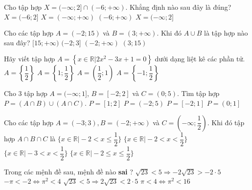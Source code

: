 \begin{ex}%
	Cho tập hợp $X=(-\infty;2] \cap (-6;+\infty)$. Khẳng định nào sau đây là đúng?
	\choice
	{\True $X=(-6;2]$}
	{$X=(-\infty;+\infty)$}
	{$(-6;+\infty)$}
	{$X=(-\infty;2]$}
	\loigiai{
		Ta có: $X=(-\infty;2] \cap (-6;+\infty)=(-6;2]$.}
\end{ex}

\begin{ex}%
	Cho các tập hợp $A=(-2;15)$ và  $B=(3;+ \infty )$. Khi đó $A \cup B$ là tập hợp nào sau đây?
	\choice
	{$[15;+\infty ) $}
	{$(-2;3] $}
	{\True $(-2;+ \infty ) $}
	{$(3;15) $}
	\loigiai{
	}
\end{ex}

\begin{ex}%
	Hãy viết tập hợp $A=\left\{x\in \mathbb{R}\big| 2x^2-3x+1=0\right\}$ dưới dạng liệt kê các phần tử.
	\choice
	{$A=\left\{\dfrac{1}{2}\right\}$}
	{\True $A=\left\{1; \dfrac{1}{2}\right\}$}
	{$A=\left(\dfrac{1}{2}; 1\right)$}
	{$A=\left\{-1; \dfrac{1}{2}\right\}$}
\end{ex}

\begin{ex}%
	Cho 3 tập hợp $A=(-\infty;1]$, $B=[-2;2]$ và $C=(0;5)$. Tìm tập hợp $P=(A\cap B)\cup (A\cap C)$.
	\choice
	{$P=\left[1;2\right] $}
	{$P= \left(-2;5\right)$}
	{\True$P=\left[-2;1\right]$}
	{$ P=\left(0;1\right]$}
	\loigiai{
	}
\end{ex}

\begin{ex}%
	Cho các tập hợp $A=(-3;3), B=(-2;+\infty )$ và $C=\left( -\infty; \dfrac{1}{2} \right)$. Khi đó tập hợp $A\cap B \cap C$ là
	\choice
	{$ \bigg\lbrace x \in \mathbb{R} \big| -2<x\le \dfrac{1}{2} \bigg\rbrace$}
	{\True $\bigg\lbrace x \in \mathbb{R} \big| -2<x<\dfrac{1}{2} \bigg\rbrace $}
	{$\bigg\lbrace x \in \mathbb{R} \big| -3<x<\dfrac{1}{2} \bigg\rbrace $}
	{$\bigg\lbrace x \in \mathbb{R} \big| -2\le x\le \dfrac{1}{2} \bigg\rbrace $}
	\loigiai{
	}
\end{ex}

\begin{ex}%
	Trong các mệnh đề sau, mệnh đề nào \textbf{sai} ?
	\choice
	{ $\sqrt{23}<5\Rightarrow -2\sqrt{23}>-2\cdot5$}
	{ \True $-\pi <-2\Leftrightarrow {{\pi }^2}<4$}
	{ $\sqrt{23}<5\Rightarrow 2\sqrt{23}<2\cdot5$}
	{ $\pi <4\Leftrightarrow {{\pi }^2}<16$}
	\loigiai{
	}
\end{ex}


